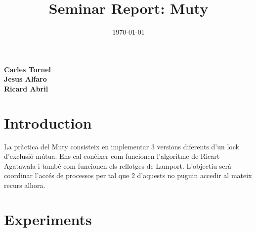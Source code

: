 \documentclass[a4paper, 10pt]{article}
\title{Seminar Report: Muty}
\date{\normalsize\today{}}
\begin{document}
\maketitle

\begin{center}
  \textbf{Carles Tornel}\\
  \textbf{Jesus Alfaro}\\
  \textbf{Ricard Abril}

\end{center}

\section{Introduction}
\begin{flushleft}
La pràctica del Muty consisteix en implementar 3 versions diferents d'un lock d'exclusió mútua. Ens cal conèixer com funcionen l'algoritme de Ricart Agatawala i també
com funcionen els rellotges de Lamport. L'objectiu serà coordinar l'accés de processos per tal que 2 d'aquests no puguin accedir al mateix recurs alhora.

\end{flushleft}

\newpage
\section{Experiments}
\end{document}

